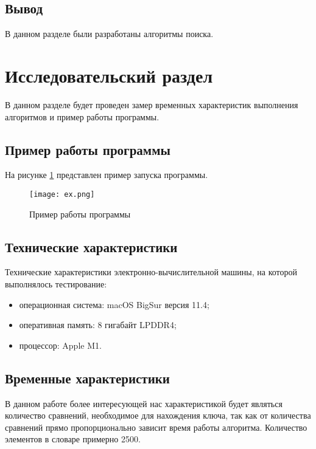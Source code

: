\subsection{Вывод}

В данном разделе были разработаны алгоритмы поиска.

\section{Исследовательский раздел}

В данном разделе будет проведен замер временных характеристик выполнения алгоритмов и пример работы программы.

\subsection{Пример работы программы}

На рисунке \ref{img:ex} представлен пример запуска программы. \\

\begin{figure}[H]
    \centering
    \texttt{[image: ex.png]}
    \caption{Пример работы программы}
    \label{img:ex}
\end{figure}

\subsection{Технические характеристики}

Технические характеристики электронно-вычислительной машины, на которой выполнялось тестирование:

\begin{itemize}
    \item операционная система: macOS BigSur версия 11.4;
    \item оперативная память: 8 гигабайт LPDDR4;
    \item процессор: Apple M1.
\end{itemize}

\subsection{Временные характеристики}

В данном работе более интересующей нас характеристикой будет являться количество сравнений, необходимое для нахождения ключа, так как от количества сравнений прямо пропорционально зависит время работы алгоритма. Количество элементов в словаре примерно 2500.

